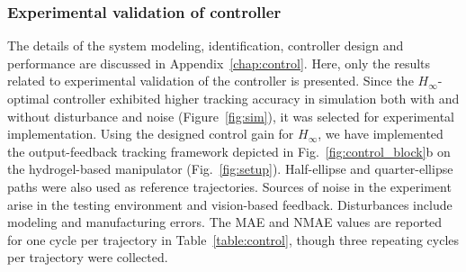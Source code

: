 \subsubsection{Experimental validation of controller}
The details of the system modeling, identification, controller design and performance are discussed in Appendix~\ref{chap:control}. Here, only the results related to experimental validation of the controller is presented. Since the $H_\infty$-optimal controller exhibited higher tracking accuracy in simulation both with and without disturbance and noise (Figure~\ref{fig:sim}), it was selected for experimental implementation. Using the designed control gain for $H_\infty$, we have implemented the output-feedback tracking framework depicted in Fig.~\ref{fig:control_block}b on the hydrogel-based manipulator (Fig.~\ref{fig:setup}). Half-ellipse and quarter-ellipse paths were also used as reference trajectories. Sources of noise in the experiment arise in the testing environment and vision-based feedback. Disturbances include modeling and manufacturing errors. The MAE and NMAE values are reported for one cycle per trajectory in Table~\ref{table:control}, though three repeating cycles per trajectory were collected.

